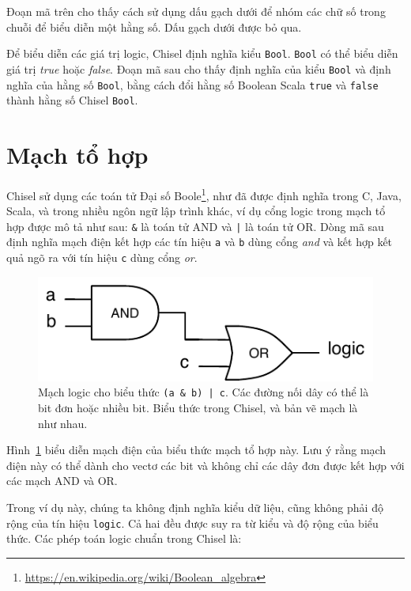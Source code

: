 \documentclass[%
    10pt,
    headinclude, footexclude,
    openright, %
    notitlepage,
    cleardoubleempty,
    headsepline,
    pointlessnumbers,
    bibtotoc, idxtotoc,
    ]{scrbook}
\newcommand{\code}[1]{{\small{\texttt{#1}}}}
\newcommand{\scale}{0.7}
\newcommand{\myref}[2]{\href{#1}{#2}}
\renewcommand{\myref}[2]{{#2}{\footnote{\url{#1}}}}
\begin{document}

\noindent Đoạn mã trên cho thấy cách sử dụng dấu gạch dưới để nhóm các chữ số trong chuỗi để biểu diễn một hằng số. 
Dấu gạch dưới được bỏ qua.

Để biểu diễn các giá trị logic, Chisel định nghĩa kiểu \code{Bool}.
\code{Bool} có thể biểu diễn giá trị \emph{true} hoặc \emph{false}.
Đoạn mã sau cho thấy định nghĩa của kiểu \code{Bool} và định nghĩa của hằng số
\code{Bool}, bằng cách đổi hằng số Boolean Scala \code{true}
và \code{false} thành hằng số Chisel \code{Bool}.



\section{Mạch tổ hợp}

Chisel sử dụng các toán tử \myref{https://en.wikipedia.org/wiki/Boolean_algebra}{Đại số Boole},
như đã được định nghĩa trong C, Java, Scala, và trong nhiều ngôn ngữ lập trình khác,
ví dụ cổng logic trong mạch tổ hợp được mô tả như sau: \code{\&} là toán tử AND và \code{|} là toán tử OR.
Dòng mã sau định nghĩa mạch điện kết hợp các tín hiệu \code{a} và \code{b} dùng cổng \emph{and}
và kết hợp kết quả ngõ ra với tín hiệu \code{c} dùng cổng \emph{or}.


\begin{figure}
  \centering
  \includegraphics[scale=\scale]{figures/logic}
  \caption{Mạch logic cho biểu thức \code{(a \& b) | c}.
  Các đường nối dây có thể là bit đơn hoặc nhiều bit. Biểu thức trong Chisel, và bản vẽ mạch là như nhau.}
  \label{fig:logic}
\end{figure}


Hình~\ref{fig:logic} biểu diễn mạch điện của biểu thức mạch tổ hợp này.
Lưu ý rằng mạch điện này có thể dành cho vectơ các bit và không chỉ các dây đơn được kết hợp với các mạch AND và OR. 

Trong ví dụ này, chúng ta không định nghĩa kiểu dữ liệu, cũng không phải độ rộng của tín hiệu \code{logic}.
Cả hai đều được suy ra từ kiểu và độ rộng của biểu thức. 
Các phép toán logic chuẩn trong Chisel là:
\end{document}
